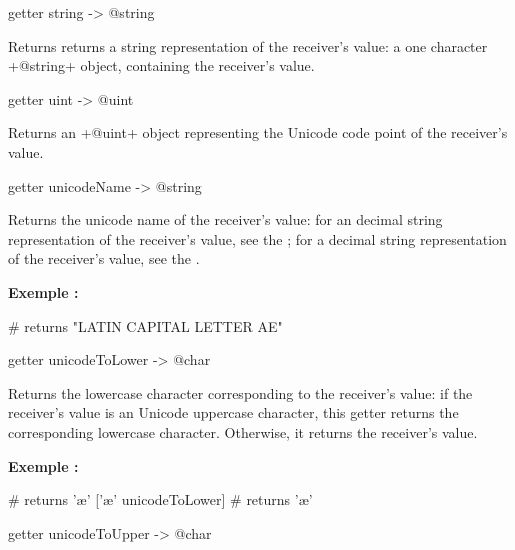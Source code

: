 
\begin{galgas}
getter string -> @string
\end{galgas}

Returns returns a string representation of the receiver's value: a one character \ggs+@string+ object, containing the receiver's value.





\begin{galgas}
getter uint -> @uint
\end{galgas}

Returns an \ggs+@uint+ object representing the Unicode code point of the receiver's value.





\begin{galgas}
getter unicodeName -> @string
\end{galgas}

Returns the unicode name of the receiver's value: for an decimal string representation of the receiver's value, see the ; for a decimal string representation of the receiver's value, see the .

\textbf{Exemple :}
\begin{galgas}
['Æ' unicodeName] # returns "LATIN CAPITAL LETTER AE"
\end{galgas}





\begin{galgas}
getter unicodeToLower -> @char
\end{galgas}

Returns the lowercase character corresponding to the receiver's value: if the receiver's value is an Unicode uppercase character, this getter returns the corresponding lowercase character. Otherwise, it returns the receiver's value.

\textbf{Exemple :}
\begin{galgas}
['Æ' unicodeToLower] # returns 'æ'
['æ' unicodeToLower] # returns 'æ'
\end{galgas}





\begin{galgas}
getter unicodeToUpper -> @char
\end{galgas}

